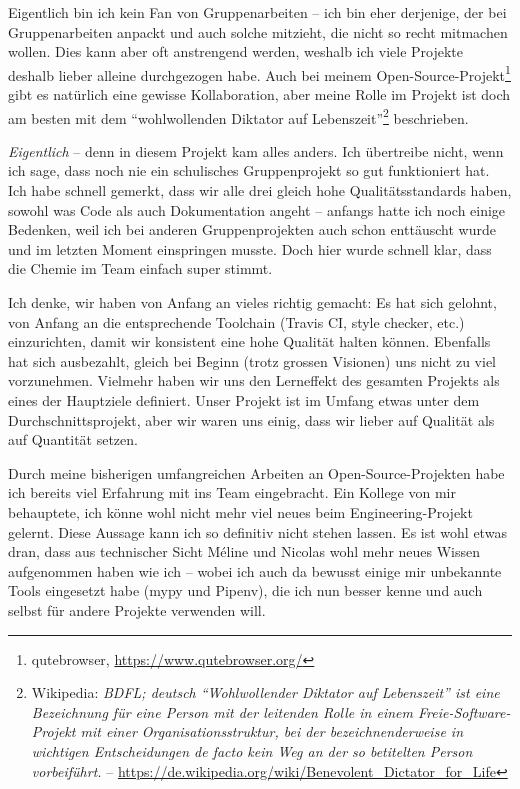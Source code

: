 \documentclass[a4paper]{article}
\begin{document}
Eigentlich bin ich kein Fan von Gruppenarbeiten -- ich bin eher derjenige, der
bei Gruppenarbeiten anpackt und auch solche mitzieht, die nicht so recht
mitmachen wollen. Dies kann aber oft anstrengend werden, weshalb ich viele Projekte
deshalb lieber alleine durchgezogen habe. Auch bei meinem
Open-Source-Projekt\footnote{qutebrowser, \url{https://www.qutebrowser.org/}}
gibt es natürlich eine gewisse Kollaboration, aber meine Rolle im Projekt ist
doch am besten mit dem ``wohlwollenden Diktator auf
Lebenszeit''\footnote{Wikipedia: \emph{BDFL; deutsch ``Wohlwollender Diktator auf Lebenszeit'' ist eine Bezeichnung für eine Person mit der leitenden Rolle in einem Freie-Software-Projekt mit einer Organisationsstruktur, bei der bezeichnenderweise in wichtigen Entscheidungen de facto kein Weg an der so betitelten Person vorbeiführt.} -- \url{https://de.wikipedia.org/wiki/Benevolent_Dictator_for_Life}} beschrieben.

\emph{Eigentlich} -- denn in diesem Projekt kam alles anders. Ich übertreibe
nicht, wenn ich sage, dass noch nie ein schulisches Gruppenprojekt so gut
funktioniert hat. Ich habe schnell gemerkt, dass wir alle drei gleich hohe
Qualitätsstandards haben, sowohl was Code als auch Dokumentation angeht --
anfangs hatte ich noch einige Bedenken, weil ich bei anderen Gruppenprojekten
auch schon enttäuscht wurde und im letzten Moment einspringen musste. Doch hier
wurde schnell klar, dass die Chemie im Team einfach super stimmt.

Ich denke, wir haben von Anfang an vieles richtig gemacht: Es hat sich
gelohnt, von Anfang an die entsprechende Toolchain (Travis CI, style checker,
etc.) einzurichten, damit wir konsistent eine hohe Qualität halten können.
Ebenfalls hat sich ausbezahlt, gleich bei Beginn (trotz grossen Visionen) uns
nicht zu viel vorzunehmen. Vielmehr haben wir uns den Lerneffekt des gesamten
Projekts als eines der Hauptziele definiert. Unser Projekt ist im Umfang etwas
unter dem Durchschnittsprojekt, aber wir waren uns einig, dass wir lieber auf
Qualität als auf Quantität setzen.

Durch meine bisherigen umfangreichen Arbeiten an Open-Source-Projekten habe ich
bereits viel Erfahrung mit ins Team eingebracht. Ein Kollege von mir behauptete,
ich könne wohl nicht mehr viel neues beim Engineering-Projekt gelernt. Diese
Aussage kann ich so definitiv nicht stehen lassen. Es ist wohl etwas dran, dass
aus technischer Sicht Méline und Nicolas wohl mehr neues Wissen aufgenommen
haben wie ich -- wobei ich auch da bewusst einige mir unbekannte Tools
eingesetzt habe (mypy und Pipenv), die ich nun besser kenne und auch selbst für
andere Projekte verwenden will.
\end{document}

